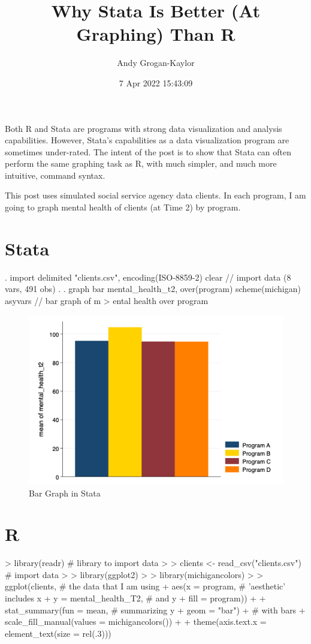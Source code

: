 \documentclass[
]{article}
\title{Why Stata Is Better (At Graphing) Than R}
\author{Andy Grogan-Kaylor}
\date{7 Apr 2022 15:43:09}
\begin{document}
\maketitle

Both R and Stata are programs with strong data visualization and
analysis capabilities. However, Stata's capabilities as a data
visualization program are sometimes under-rated. The intent of the post
is to show that Stata can often perform the same graphing task as R,
with much simpler, and much more intuitive, command syntax.

This post uses simulated social service agency data clients. In each
program, I am going to graph mental health of clients (at Time 2) by
program.

\hypertarget{stata}{%
\section{Stata}\label{stata}}

\begin{stlog}
. import delimited "clients.csv", encoding(ISO-8859-2) clear // import data
(8 vars, 491 obs)
{\smallskip}
.     
. graph bar mental_health_t2, over(program) scheme(michigan) asyvars // bar graph of m
> ental health over program
\end{stlog}



\begin{figure}
\centering
\includegraphics[width=0.75\linewidth]{mybarStata.png}
\caption{Bar Graph in Stata}
\end{figure}

\hypertarget{r}{%
\section{R}\label{r}}

\begin{stlog}
> library(readr) \# library to import data
>     
> clients <- read_csv("clients.csv") \# import data
>     
> library(ggplot2)
>     
> library(michigancolors)
> 
> ggplot(clients, \# the data that I am using
+   aes(x = program, \# 'aesthetic' includes x
+       y = mental_health_T2, \# and y
+       fill = program)) + 
+   stat_summary(fun = mean, \# summarizing y 
+                geom = "bar") + \# with bars
+   scale_fill_manual(values = michigancolors()) +
+   theme(axis.text.x = element_text(size = rel(.3)))
\end{stlog}
\end{document}
